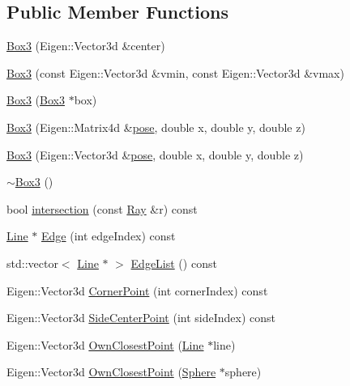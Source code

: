 \subsection*{Public Member Functions}
\begin{DoxyCompactItemize}
\item 
\hyperlink{class_box3_aad6fb7ce9a1349ebc77d53bae2518d6e}{Box3} (Eigen\+::\+Vector3d \&center)
\item 
\hyperlink{class_box3_aa871a15d2ffdedb128f3b29c40a880a1}{Box3} (const Eigen\+::\+Vector3d \&vmin, const Eigen\+::\+Vector3d \&vmax)
\item 
\hyperlink{class_box3_acb6924ddd5dd9f976c0fc6335b77f5f2}{Box3} (\hyperlink{class_box3}{Box3} $\ast$box)
\item 
\hyperlink{class_box3_a3c411ee95120b8c1704ba62432bd8554}{Box3} (Eigen\+::\+Matrix4d \&\hyperlink{class_primitive_ad8b2afbad412f6046783d155c88fe312}{pose}, double x, double y, double z)
\item 
\hyperlink{class_box3_aa681aebc8053b437bda41ea430bf44cb}{Box3} (Eigen\+::\+Vector3d \&\hyperlink{class_primitive_ad8b2afbad412f6046783d155c88fe312}{pose}, double x, double y, double z)
\item 
\hyperlink{class_box3_a4ececcc0019ac56a491d3e491d491d97}{$\sim$\+Box3} ()
\item 
bool \hyperlink{class_box3_a9bf53c640569dd979156eed253752f00}{intersection} (const \hyperlink{class_ray}{Ray} \&r) const 
\item 
\hyperlink{class_line}{Line} $\ast$ \hyperlink{class_box3_a171b1ab6451b5ca9dafbe235bd42cff5}{Edge} (int edge\+Index) const 
\item 
std\+::vector$<$ \hyperlink{class_line}{Line} $\ast$ $>$ \hyperlink{class_box3_ac34df9b1130d1123e88fd6533f82cfe3}{Edge\+List} () const 
\item 
Eigen\+::\+Vector3d \hyperlink{class_box3_a7fe8dce86382a1313b1031a498b8a0a0}{Corner\+Point} (int corner\+Index) const 
\item 
Eigen\+::\+Vector3d \hyperlink{class_box3_a03b398c46370091bea527b09ffe4a14e}{Side\+Center\+Point} (int side\+Index) const 
\item 
Eigen\+::\+Vector3d \hyperlink{class_box3_ac329cb319677766639aaac40dc327a85}{Own\+Closest\+Point} (\hyperlink{class_line}{Line} $\ast$line)
\item 
Eigen\+::\+Vector3d \hyperlink{class_box3_ac8d506eddf64b2b97049e895250cd8b4}{Own\+Closest\+Point} (\hyperlink{class_sphere}{Sphere} $\ast$sphere)
\item 

\end{DoxyCompactItemize}
